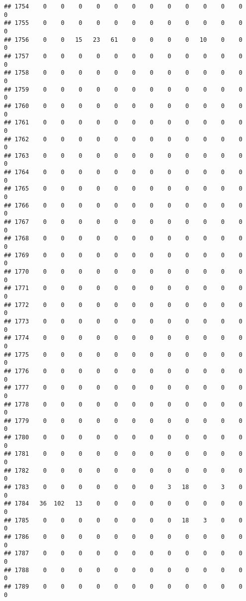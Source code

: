 \documentclass[]{article}
\begin{document}
\begin{verbatim}
## 1754    0    0    0    0    0    0    0    0    0    0    0    0    0
## 1755    0    0    0    0    0    0    0    0    0    0    0    0    0
## 1756    0    0   15   23   61    0    0    0    0   10    0    0    0
## 1757    0    0    0    0    0    0    0    0    0    0    0    0    0
## 1758    0    0    0    0    0    0    0    0    0    0    0    0    0
## 1759    0    0    0    0    0    0    0    0    0    0    0    0    0
## 1760    0    0    0    0    0    0    0    0    0    0    0    0    0
## 1761    0    0    0    0    0    0    0    0    0    0    0    0    0
## 1762    0    0    0    0    0    0    0    0    0    0    0    0    0
## 1763    0    0    0    0    0    0    0    0    0    0    0    0    0
## 1764    0    0    0    0    0    0    0    0    0    0    0    0    0
## 1765    0    0    0    0    0    0    0    0    0    0    0    0    0
## 1766    0    0    0    0    0    0    0    0    0    0    0    0    0
## 1767    0    0    0    0    0    0    0    0    0    0    0    0    0
## 1768    0    0    0    0    0    0    0    0    0    0    0    0    0
## 1769    0    0    0    0    0    0    0    0    0    0    0    0    0
## 1770    0    0    0    0    0    0    0    0    0    0    0    0    0
## 1771    0    0    0    0    0    0    0    0    0    0    0    0    0
## 1772    0    0    0    0    0    0    0    0    0    0    0    0    0
## 1773    0    0    0    0    0    0    0    0    0    0    0    0    0
## 1774    0    0    0    0    0    0    0    0    0    0    0    0    0
## 1775    0    0    0    0    0    0    0    0    0    0    0    0    0
## 1776    0    0    0    0    0    0    0    0    0    0    0    0    0
## 1777    0    0    0    0    0    0    0    0    0    0    0    0    0
## 1778    0    0    0    0    0    0    0    0    0    0    0    0    0
## 1779    0    0    0    0    0    0    0    0    0    0    0    0    0
## 1780    0    0    0    0    0    0    0    0    0    0    0    0    0
## 1781    0    0    0    0    0    0    0    0    0    0    0    0    0
## 1782    0    0    0    0    0    0    0    0    0    0    0    0    0
## 1783    0    0    0    0    0    0    0    3   18    0    3    0    0
## 1784   36  102   13    0    0    0    0    0    0    0    0    0    0
## 1785    0    0    0    0    0    0    0    0   18    3    0    0    0
## 1786    0    0    0    0    0    0    0    0    0    0    0    0    0
## 1787    0    0    0    0    0    0    0    0    0    0    0    0    0
## 1788    0    0    0    0    0    0    0    0    0    0    0    0    0
## 1789    0    0    0    0    0    0    0    0    0    0    0    0    0

\end{verbatim}
\end{document}
